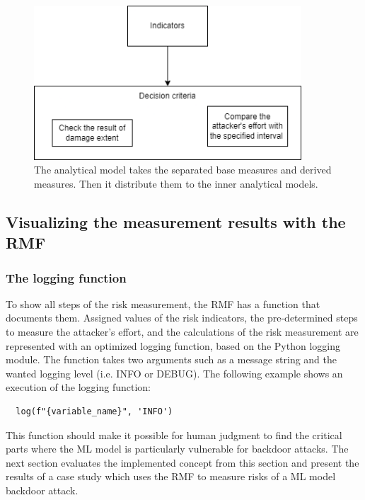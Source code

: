 \begin{figure}[ht!]
  \centering
  \includegraphics[width=10cm]{pictures/impl_dec_criteria.png}
  \caption{The analytical model takes the separated base measures and derived measures. Then it distribute them to the inner analytical models.}
  \label{fig:impl_dec_criteria}
\end{figure}

\subsection{Visualizing the measurement results with the RMF}
\label{sec:impl_meas_res}

\subsubsection*{The logging function}

To show all steps of the risk measurement, the RMF has a function that documents them. Assigned values of the risk indicators, the pre-determined steps to measure the attacker's effort, and the calculations of the risk measurement are represented with an optimized logging function, based on the Python logging module. The function takes two arguments such as a message string and the wanted logging level (i.e. INFO or DEBUG). The following example shows an execution of the logging function:

\begin{lstlisting}
  log(f"{variable_name}", 'INFO')
\end{lstlisting}

This function should make it possible for human judgment to find the critical parts where the ML model is particularly vulnerable for backdoor attacks. The next section evaluates the implemented concept from this section and present the results of a case study which uses the RMF to measure risks of a ML model backdoor attack.

